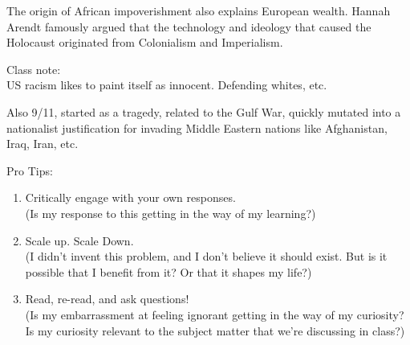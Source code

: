 \documentclass{report}
\begin{document}
\begin{mdframed}
\begin{description}
            The origin of African impoverishment also explains
            European wealth. Hannah Arendt famously argued that
            the technology and ideology that caused the 
            Holocaust originated from Colonialism and Imperialism.

            \begin{center}
            \end{center}

            \begin{center}
                \begin{mdframed}
                    Class note: 
                    \\
                    US racism likes to paint itself as innocent.
                    Defending whites, etc.

                    Also 9/11, started as a tragedy, related to the
                    Gulf War, quickly mutated into a nationalist
                    justification for invading Middle Eastern nations like
                    Afghanistan, Iraq, Iran, etc.

                \end{mdframed}
            \end{center}
            Pro Tips:
            \begin{enumerate}
                \item Critically engage with your own
                    responses.\\(Is my response to this
                    getting in the way of my learning?)
                \item Scale up. Scale Down.\\
                    (I didn't invent this problem, and I
                    don't believe it should exist. But is it
                    possible that I benefit from it? Or that
                    it shapes my life?)
                \item Read, re-read, and ask questions!\\
                    (Is my embarrassment at feeling ignorant
                    getting in the way of my curiosity?
                    Is my curiosity relevant to the subject
                    matter that we're discussing in class?)
            \end{enumerate}
            

    \end{description}

    \vspace{30}

\end{mdframed}
\pagebreak
\end{document}

